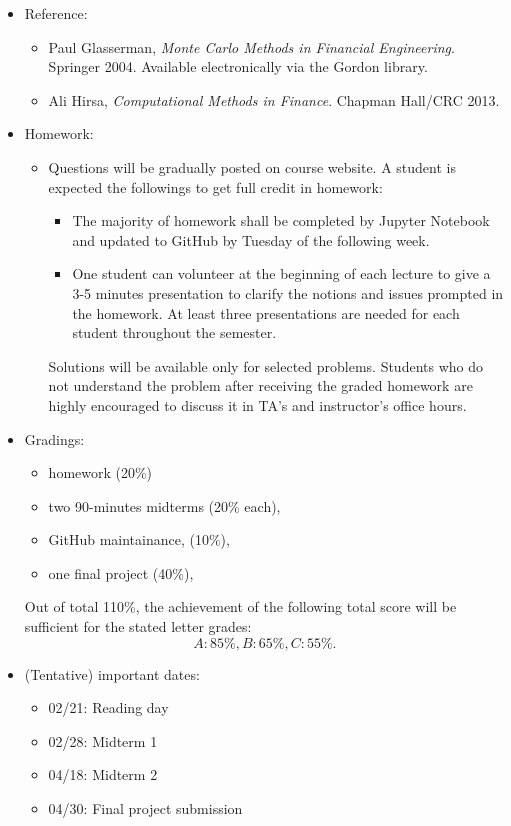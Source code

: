 \documentclass[11pt]{amsart}
\begin{document}
\begin{itemize}
\item Reference:
\begin{itemize}
\item Paul Glasserman, \textit{Monte Carlo Methods in Financial Engineering}. Springer 2004. Available electronically via the Gordon library.
 \item Ali Hirsa, \textit{Computational Methods in Finance}. Chapman Hall/CRC 2013. 
\end{itemize}

\item Homework: 
\begin{itemize}\item  
Questions will be gradually 
posted on course website. 
A student is expected the followings to get full credit in homework:
\begin{itemize}
\item The majority of homework shall be completed by Jupyter Notebook and updated to GitHub by Tuesday of the following week.
\item One student can volunteer at the beginning of each lecture
to give a 3-5 minutes presentation 
to clarify the notions and issues prompted in the homework. 
At least three presentations are needed for each student 
throughout the semester.
\end{itemize}
Solutions will be available only for selected problems. Students who do not understand the problem after receiving the graded homework are {highly encouraged} to discuss it in TA's and instructor's office hours. 
\end{itemize}

\item Gradings:
\begin{itemize}
 \item
 homework (20\%)
 \item 
 two 90-minutes midterms (20\% each), 
 \item GitHub maintainance, (10\%), 
 \item one final project (40\%), 
\end{itemize}
Out of total 110\%, the achievement of the following total score will be sufficient for the stated letter grades:
$$A: 85\%, B: 65\%, C: 55\%.$$

\item (Tentative) important dates:
\begin{itemize}
 \item 02/21: Reading day
 \item 02/28: Midterm 1
 \item 04/18: Midterm 2
 \item 04/30: Final project submission
\end{itemize}


\end{itemize}
\end{document}
